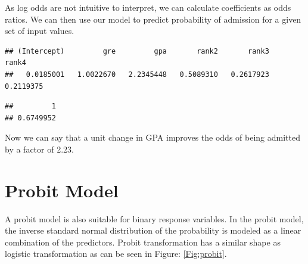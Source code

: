 \documentclass[11pt, letterpaper, twoside]{memoir}\usepackage{knitr}
\begin{document}
As log odds are not intuitive to interpret, we can calculate coefficients as odds ratios. We can then use our model to predict probability of admission for a given set of input values.
\begin{knitrout}
\color{fgcolor}\begin{kframe}
\begin{alltt}
\hlstd{(}
\end{alltt}
\begin{verbatim}
## (Intercept)         gre         gpa       rank2       rank3       rank4 
##   0.0185001   1.0022670   2.2345448   0.5089310   0.2617923   0.2119375
\end{verbatim}
\begin{alltt}
 \hlkwb{<-} \hlstd{(} \hlstd{=} \hlstd{,}  \hlstd{=} \hlstd{,}  \hlstd{=} \hlstd{)}
\hlopt{$} \hlkwb{=} \hlopt{$}
    \hlstd{=} \hlstd{)}
\end{alltt}
\begin{verbatim}
##         1 
## 0.6749952
\end{verbatim}
\end{kframe}
\end{knitrout}

Now we can say that a unit change in GPA improves the odds of being admitted by a factor of 2.23.

\section{Probit Model}

A probit model is also suitable for binary response variables.  In the probit model, the inverse standard normal distribution of the probability is modeled as a linear combination of the predictors. Probit transformation has a similar shape as logistic transformation as can be seen in Figure: \ref{Fig:probit}.
\end{document}

